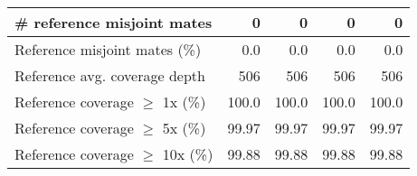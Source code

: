 \documentclass[12pt,a4paper]{article}
\begin{document}
\begin{table}[ht]
\begin{center}
\begin{tabular}{|l*{4}{|r}|}
\# reference misjoint mates & 0 & 0 & 0 & 0 \\ \hline
Reference misjoint mates (\%) & 0.0 & 0.0 & 0.0 & 0.0 \\ \hline
Reference avg. coverage depth & 506 & 506 & 506 & 506 \\ \hline
Reference coverage $\geq$ 1x (\%) & 100.0 & 100.0 & 100.0 & 100.0 \\ \hline
Reference coverage $\geq$ 5x (\%) & 99.97 & 99.97 & 99.97 & 99.97 \\ \hline
Reference coverage $\geq$ 10x (\%) & 99.88 & 99.88 & 99.88 & 99.88 \\ \hline
\end{tabular}
\end{center}
\end{table}
\end{document}
